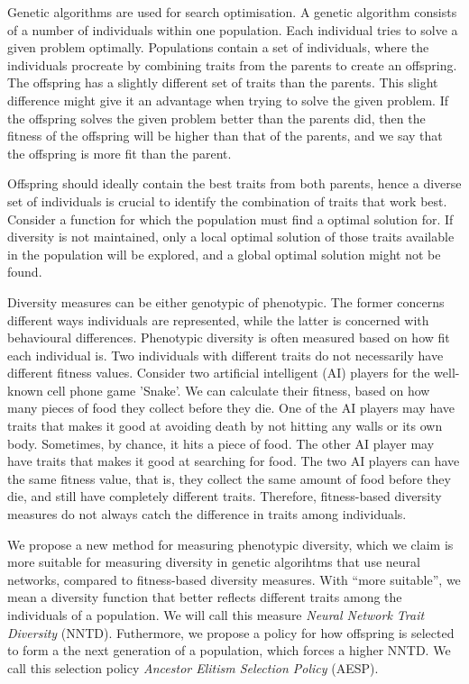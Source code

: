 Genetic algorithms are used for search optimisation. A genetic algorithm consists of a number of individuals within one population. Each individual tries to solve a given problem optimally. Populations contain a set of individuals, where the individuals procreate by combining traits from the parents to create an offspring. The offspring has a slightly different set of traits than the parents. This slight difference might give it an advantage when trying to solve the given problem. If the offspring solves the given problem better than the parents did, then the fitness of the offspring will be higher than that of the parents, and we say that the offspring is more fit than the parent. 

Offspring should ideally contain the best traits from both parents, hence a diverse set of individuals is crucial to identify the combination of traits that work best. Consider a function for which the population must find a optimal solution for. If diversity is not maintained, only a local optimal solution of those traits available in the population will be explored, and a global optimal solution might not be found.
\cite{ursem2002diversity}

Diversity measures can be either genotypic of phenotypic. The former concerns different ways individuals are represented, while the latter is concerned with behavioural differences. Phenotypic diversity is often measured based on how fit each individual is. Two individuals with different traits do not necessarily have different fitness values. Consider two artificial intelligent (AI) players for the well-known cell phone game 'Snake'. We can calculate their fitness, based on how many pieces of food they collect before they die. One of the AI players may have traits that makes it good at avoiding death by not hitting any walls or its own body. Sometimes, by chance, it hits a piece of food. The other AI player may have traits that makes it good at searching for food. The two AI players can have the same fitness value, that is, they collect the same amount of food before they die, and still have completely different traits. Therefore, fitness-based diversity measures do not always catch the difference in traits among individuals.

We propose a new method for measuring phenotypic diversity, which we claim is more suitable for measuring diversity in genetic algorihtms that use neural networks, compared to fitness-based diversity measures. With ``more suitable'', we mean a diversity function that better reflects different traits among the individuals of a population.
We will call this measure \emph{Neural Network Trait Diversity} (NNTD). Futhermore, we propose a policy for how offspring is selected to form a the next generation of a population, which forces a higher NNTD. We call this selection policy \emph{Ancestor Elitism Selection Policy} (AESP).

